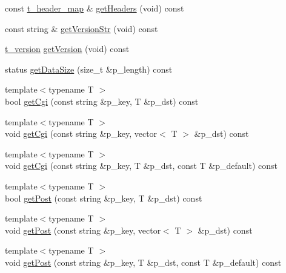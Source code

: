 \begin{DoxyCompactItemize}
\item 
const \hyperlink{classxtd_1_1network_1_1http_1_1Request_aeaf2a69c884e81983aebaf36518c310e}{t\+\_\+header\+\_\+map} \& \hyperlink{classxtd_1_1network_1_1http_1_1Request_abbe34833ea46c5a794c7c49796a192c3}{get\+Headers} (void) const 
\item 
const string \& \hyperlink{classxtd_1_1network_1_1http_1_1Request_a609f7328025e89fd8325677212ab307b}{get\+Version\+Str} (void) const 
\item 
\hyperlink{classxtd_1_1network_1_1http_1_1Request_ad1842a3667ff0a96222bb69262cda536}{t\+\_\+version} \hyperlink{classxtd_1_1network_1_1http_1_1Request_acdf8a64d92f997aa7a0eaf7fc07cf897}{get\+Version} (void) const 
\item 
status \hyperlink{classxtd_1_1network_1_1http_1_1Request_a90a878fc6498d5594617329da39d1ac5}{get\+Data\+Size} (size\+\_\+t \&p\+\_\+length) const 
\item 
{\footnotesize template$<$typename T $>$ }\\bool \hyperlink{classxtd_1_1network_1_1http_1_1Request_a7af5942f7505ac377c8017f51b24854e}{get\+Cgi} (const string \&p\+\_\+key, T \&p\+\_\+dst) const 
\item 
{\footnotesize template$<$typename T $>$ }\\void \hyperlink{classxtd_1_1network_1_1http_1_1Request_adc71d7250d7064b513b619091b0a6961}{get\+Cgi} (const string \&p\+\_\+key, vector$<$ T $>$ \&p\+\_\+dst) const 
\item 
{\footnotesize template$<$typename T $>$ }\\void \hyperlink{classxtd_1_1network_1_1http_1_1Request_ad1efea31852175056b036fdd2df71135}{get\+Cgi} (const string \&p\+\_\+key, T \&p\+\_\+dst, const T \&p\+\_\+default) const 
\item 
{\footnotesize template$<$typename T $>$ }\\bool \hyperlink{classxtd_1_1network_1_1http_1_1Request_a052d76c6e9f2d8eede058c7d2fddd9ef}{get\+Post} (const string \&p\+\_\+key, T \&p\+\_\+dst) const 
\item 
{\footnotesize template$<$typename T $>$ }\\void \hyperlink{classxtd_1_1network_1_1http_1_1Request_a073d8eef444c0d981e3bd5137e13de3b}{get\+Post} (const string \&p\+\_\+key, vector$<$ T $>$ \&p\+\_\+dst) const 
\item 
{\footnotesize template$<$typename T $>$ }\\void \hyperlink{classxtd_1_1network_1_1http_1_1Request_ab4b8f57135d2f6d1e622ae5fe81c1ca7}{get\+Post} (const string \&p\+\_\+key, T \&p\+\_\+dst, const T \&p\+\_\+default) const 

\end{DoxyCompactItemize}
